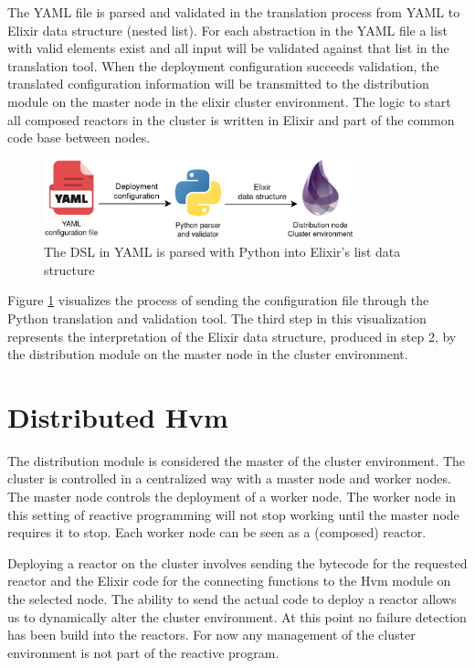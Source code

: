 \documentclass[a4paper]{book}
\begin{document}
The YAML file is parsed and validated in the translation process from YAML to Elixir data structure (nested list). For each abstraction in the YAML file a list with valid elements exist and all input will be validated against that list in the translation tool. When the deployment configuration succeeds validation, the translated configuration  information will be transmitted to the distribution module on the master node in the elixir cluster environment. The logic to start all composed reactors in the cluster is written in Elixir and part of the common code base between nodes. 

\begin{figure}[h]
	\centering
	\includegraphics[width=0.8\textwidth]{yaml.drawio}
	\caption{The DSL in YAML is parsed with Python into Elixir's list data structure}
	\label{fig:yaml}
\end{figure}  

Figure \ref{fig:yaml} visualizes the process of sending the configuration file through the Python translation and validation tool. The third step in this visualization represents the interpretation of the Elixir data structure, produced in step 2, by the distribution module on the master node in the cluster environment.


\section{Distributed Hvm}
The distribution module is considered the master of the cluster environment. The cluster is controlled in a centralized way with a master node and worker nodes. The master node controls the deployment of a worker node. The worker node in this setting of reactive programming will not stop working until the master node requires it to stop. Each worker node can be seen as a (composed) reactor.  

Deploying a reactor on the cluster involves sending the bytecode for the requested reactor and the Elixir code for the connecting functions to the Hvm module on the selected node. The ability to send the actual code to deploy a reactor allows us to dynamically alter the cluster environment. At this point no failure detection has been build into the reactors. For now any management of the cluster environment is not part of the reactive program.  
\end{document}
